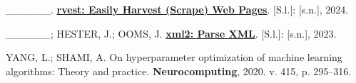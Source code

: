 \documentclass[
  12pt,
  a4paper,
]{scrreprt}
\newlength{\cslhangindent}
\newenvironment{CSLReferences}[2] %
 {\begin{list}{}{%
  \setlength{\itemindent}{0pt}
  \setlength{\leftmargin}{0pt}
  \setlength{\parsep}{0pt}
  \ifodd #1
   \setlength{\leftmargin}{\cslhangindent}
   \setlength{\itemindent}{-1\cslhangindent}
  \fi
  \setlength{\itemsep}{#2\baselineskip}}}
 {\end{list}}
\begin{document}
\begin{CSLReferences}{0}{1}
\_\_\_\_\_\_. \textbf{\href{https://rvest.tidyverse.org/}{rvest: Easily
Harvest (Scrape) Web Pages}}. {[}S.l.{]}: {[}s.n.{]}, 2024.

\_\_\_\_\_\_; HESTER, J.; OOMS, J.
\textbf{\href{https://xml2.r-lib.org/}{xml2: Parse XML}}. {[}S.l.{]}:
{[}s.n.{]}, 2023.

YANG, L.; SHAMI, A. On hyperparameter optimization of machine learning
algorithms: Theory and practice. \textbf{Neurocomputing}, 2020. v. 415,
p. 295--316.

\end{CSLReferences}
\end{document}
